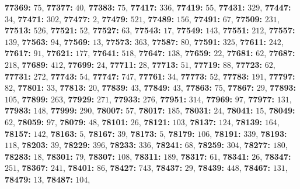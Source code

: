 \textsf{\bfseries 77369:} $75$, \textsf{\bfseries 77377:} $40$, \textsf{\bfseries 77383:} $75$, \textsf{\bfseries 77417:} $336$, \textsf{\bfseries 77419:} $55$, \textsf{\bfseries 77431:} $329$, \textsf{\bfseries 77447:} $34$, \textsf{\bfseries 77471:} $302$, \textsf{\bfseries 77477:} $2$, \textsf{\bfseries 77479:} $521$, \textsf{\bfseries 77489:} $156$, \textsf{\bfseries 77491:} $67$, \textsf{\bfseries 77509:} $231$, \textsf{\bfseries 77513:} $526$, \textsf{\bfseries 77521:} $52$, \textsf{\bfseries 77527:} $63$, \textsf{\bfseries 77543:} $17$, \textsf{\bfseries 77549:} $143$, \textsf{\bfseries 77551:} $212$, \textsf{\bfseries 77557:} $139$, \textsf{\bfseries 77563:} $94$, \textsf{\bfseries 77569:} $13$, \textsf{\bfseries 77573:} $363$, \textsf{\bfseries 77587:} $80$, \textsf{\bfseries 77591:} $325$, \textsf{\bfseries 77611:} $242$, \textsf{\bfseries 77617:} $91$, \textsf{\bfseries 77621:} $177$, \textsf{\bfseries 77641:} $518$, \textsf{\bfseries 77647:} $138$, \textsf{\bfseries 77659:} $22$, \textsf{\bfseries 77681:} $62$, \textsf{\bfseries 77687:} $218$, \textsf{\bfseries 77689:} $412$, \textsf{\bfseries 77699:} $24$, \textsf{\bfseries 77711:} $28$, \textsf{\bfseries 77713:} $51$, \textsf{\bfseries 77719:} $88$, \textsf{\bfseries 77723:} $62$, \textsf{\bfseries 77731:} $272$, \textsf{\bfseries 77743:} $54$, \textsf{\bfseries 77747:} $747$, \textsf{\bfseries 77761:} $34$, \textsf{\bfseries 77773:} $52$, \textsf{\bfseries 77783:} $191$, \textsf{\bfseries 77797:} $82$, \textsf{\bfseries 77801:} $33$, \textsf{\bfseries 77813:} $20$, \textsf{\bfseries 77839:} $43$, \textsf{\bfseries 77849:} $43$, \textsf{\bfseries 77863:} $75$, \textsf{\bfseries 77867:} $29$, \textsf{\bfseries 77893:} $105$, \textsf{\bfseries 77899:} $263$, \textsf{\bfseries 77929:} $271$, \textsf{\bfseries 77933:} $276$, \textsf{\bfseries 77951:} $314$, \textsf{\bfseries 77969:} $97$, \textsf{\bfseries 77977:} $131$, \textsf{\bfseries 77983:} $148$, \textsf{\bfseries 77999:} $290$, \textsf{\bfseries 78007:} $57$, \textsf{\bfseries 78017:} $185$, \textsf{\bfseries 78031:} $24$, \textsf{\bfseries 78041:} $15$, \textsf{\bfseries 78049:} $62$, \textsf{\bfseries 78059:} $97$, \textsf{\bfseries 78079:} $48$, \textsf{\bfseries 78101:} $26$, \textsf{\bfseries 78121:} $103$, \textsf{\bfseries 78137:} $124$, \textsf{\bfseries 78139:} $164$, \textsf{\bfseries 78157:} $142$, \textsf{\bfseries 78163:} $5$, \textsf{\bfseries 78167:} $39$, \textsf{\bfseries 78173:} $5$, \textsf{\bfseries 78179:} $106$, \textsf{\bfseries 78191:} $339$, \textsf{\bfseries 78193:} $118$, \textsf{\bfseries 78203:} $39$, \textsf{\bfseries 78229:} $396$, \textsf{\bfseries 78233:} $336$, \textsf{\bfseries 78241:} $68$, \textsf{\bfseries 78259:} $304$, \textsf{\bfseries 78277:} $180$, \textsf{\bfseries 78283:} $18$, \textsf{\bfseries 78301:} $79$, \textsf{\bfseries 78307:} $108$, \textsf{\bfseries 78311:} $189$, \textsf{\bfseries 78317:} $61$, \textsf{\bfseries 78341:} $26$, \textsf{\bfseries 78347:} $251$, \textsf{\bfseries 78367:} $241$, \textsf{\bfseries 78401:} $86$, \textsf{\bfseries 78427:} $743$, \textsf{\bfseries 78437:} $29$, \textsf{\bfseries 78439:} $448$, \textsf{\bfseries 78467:} $131$, \textsf{\bfseries 78479:} $13$, \textsf{\bfseries 78487:} $104$, 
